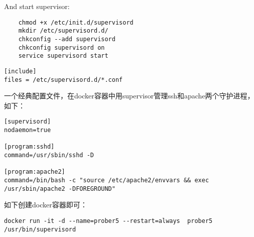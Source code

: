 And start supervisor:

\begin{verbatim}
    chmod +x /etc/init.d/supervisord
    mkdir /etc/supervisord.d/
    chkconfig --add supervisord
    chkconfig supervisord on
    service supervisord start    
\end{verbatim}

\begin{verbatim}
[include]
files = /etc/supervisord.d/*.conf
\end{verbatim}

 
一个经典配置文件，在docker容器中用supervisor管理ssh和apache两个守护进程，如下：
\begin{verbatim}
[supervisord]
nodaemon=true

[program:sshd]
command=/usr/sbin/sshd -D

[program:apache2]
command=/bin/bash -c "source /etc/apache2/envvars && exec /usr/sbin/apache2 -DFOREGROUND"
\end{verbatim}

如下创建docker容器即可：
\begin{verbatim}
docker run -it -d --name=prober5 --restart=always  prober5 /usr/bin/supervisord
\end{verbatim}


